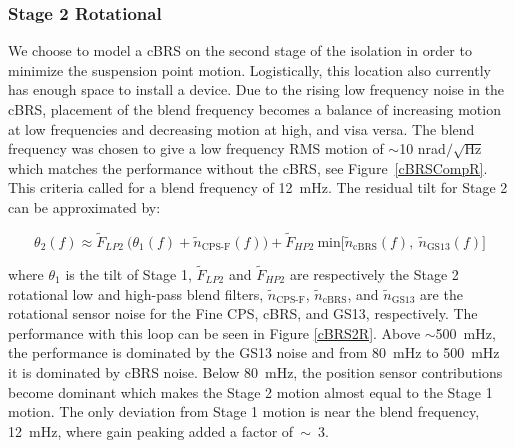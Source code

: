\documentclass [12pt, proquest]{uwthesis}[2019]
\begin{document}
\subsubsection{Stage 2 Rotational}


We choose to model a cBRS on the second stage of the isolation in order to minimize the suspension point motion. Logistically, this location also currently has enough space to install a device. Due to the rising low frequency noise in the cBRS, placement of the blend frequency becomes a balance of increasing motion at low frequencies and decreasing motion at high, and visa versa. The blend frequency was chosen to give a low frequency RMS motion of $\sim$10 nrad$/\sqrt{\text{Hz}}$ which matches the performance without the cBRS, see Figure~\ref{cBRSCompR}. This criteria called for a blend frequency of 12~mHz. The residual tilt for Stage 2 can be approximated by:

\begin{equation}
\theta_2(f)\approx \tilde{F}_{LP2}\ \big(\theta_1(f)+\tilde{n}_\text{CPS-F}(f)\big)+\tilde{F}_{HP2}\ \text{min}\big[\tilde{n}_\text{cBRS}(f),\ \tilde{n}_\text{GS13}(f)\big]
\end{equation}

where $\theta_1$ is the tilt of Stage 1, $\tilde{F}_{LP2}$ and $\tilde{F}_{HP2}$ are respectively the Stage 2 rotational low and high-pass blend filters, $\tilde{n}_\text{CPS-F}$, $\tilde{n}_\text{cBRS}$, and $\tilde{n}_\text{GS13}$ are the rotational sensor noise for the Fine CPS, cBRS, and GS13, respectively. The performance with this loop can be seen in Figure \ref{cBRS2R}. Above $\sim$500~mHz, the performance is dominated by the GS13 noise and from 80~mHz to 500~mHz it is dominated by cBRS noise. Below 80~mHz, the position sensor contributions become dominant which makes the Stage 2 motion almost equal to the Stage 1 motion. The only deviation from Stage 1 motion is near the blend frequency, 12~mHz, where gain peaking added a factor of~$\sim$~3. 
\end{document}
